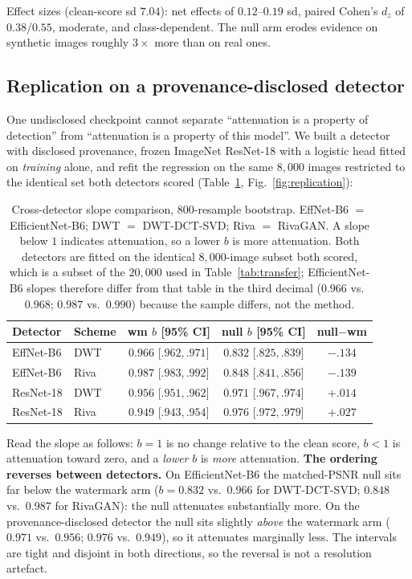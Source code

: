 \documentclass[journal]{IEEEtran}
\begin{document}
Effect sizes (clean-score sd $7.04$): net effects of $0.12$--$0.19$ sd, paired
Cohen's $d_z$ of $0.38$/$0.55$, moderate, and class-dependent. The null arm
erodes evidence on synthetic images roughly $3\times$ more than on real
ones.

\subsection{Replication on a provenance-disclosed detector}
\label{sec:replication}

One undisclosed checkpoint cannot separate ``attenuation is a property of
detection'' from ``attenuation is a property of this model''. We built a
detector with disclosed provenance, frozen ImageNet ResNet-18 with a logistic
head fitted on \emph{training} alone, and refit the regression on the same
$8{,}000$ images restricted to the identical set both detectors scored
(Table~\ref{tab:replication}, Fig.~\ref{fig:replication}):

\begin{table}[t]
\centering
\caption{Cross-detector slope comparison, 800-resample bootstrap. EffNet-B6
$=$ EfficientNet-B6; DWT $=$ DWT-DCT-SVD; Riva $=$ RivaGAN. A slope below $1$
indicates attenuation, so a lower $b$ is more attenuation. Both detectors are
fitted on the identical $8{,}000$-image subset both scored, which is a subset
of the $20{,}000$ used in Table~\ref{tab:transfer}; EfficientNet-B6 slopes
therefore differ from that table in the third decimal ($0.966$ vs.\ $0.968$;
$0.987$ vs.\ $0.990$) because the sample differs, not the method.}
\label{tab:replication}
\footnotesize
\setlength{\tabcolsep}{3pt}
\begin{tabular}{llccc}
\toprule
Detector & Scheme & wm $b$ [95\% CI] & null $b$ [95\% CI] & null$-$wm \\
\midrule
EffNet-B6 & DWT & $0.966$ [$.962,.971$] & $\mathbf{0.832}$ [$.825,.839$] & $\mathbf{-.134}$ \\
EffNet-B6 & Riva & $0.987$ [$.983,.992$] & $\mathbf{0.848}$ [$.841,.856$] & $\mathbf{-.139}$ \\
ResNet-18 & DWT & $0.956$ [$.951,.962$] & $0.971$ [$.967,.974$] & $\mathbf{+.014}$ \\
ResNet-18 & Riva & $0.949$ [$.943,.954$] & $0.976$ [$.972,.979$] & $\mathbf{+.027}$ \\
\bottomrule
\end{tabular}
\end{table}

Read the slope as follows: $b=1$ is no change relative to the clean score,
$b<1$ is attenuation toward zero, and a \emph{lower} $b$ is \emph{more}
attenuation. \textbf{The ordering reverses between detectors.}
On EfficientNet-B6 the matched-PSNR null sits far below the watermark arm
($b=0.832$ vs.\ $0.966$ for DWT-DCT-SVD; $0.848$ vs.\ $0.987$ for RivaGAN):
the null attenuates substantially more. On the provenance-disclosed detector
the null sits slightly \emph{above} the watermark arm ($0.971$ vs.\ $0.956$;
$0.976$ vs.\ $0.949$), so it attenuates marginally less. The intervals are
tight and disjoint in both directions, so the reversal is not a resolution
artefact.
\end{document}
